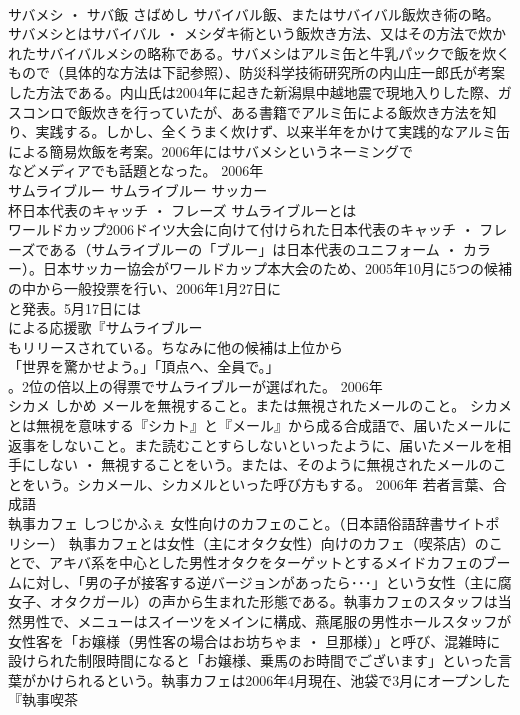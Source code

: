 \documentclass[8pt]{extreport}
\begin{document}
\begin{CJK}{UTF8}{min}
\\	サバメシ ・ サバ飯	さばめし	サバイバル飯、またはサバイバル飯炊き術の略。	サバメシとはサバイバル ・ メシダキ術という飯炊き方法、又はその方法で炊かれたサバイバルメシの略称である。サバメシはアルミ缶と牛乳パックで飯を炊くもので（具体的な方法は下記参照）、防災科学技術研究所の内山庄一郎氏が考案した方法である。内山氏は2004年に起きた新潟県中越地震で現地入りした際、ガスコンロで飯炊きを行っていたが、ある書籍でアルミ缶による飯炊き方法を知り、実践する。しかし、全くうまく炊けず、以来半年をかけて実践的なアルミ缶による簡易炊飯を考案。2006年にはサバメシというネーミングで
\\	などメディアでも話題となった。	2006年	
\\	サムライブルー	サムライブルー	サッカー
\\	杯日本代表のキャッチ ・ フレーズ	サムライブルーとは
\\	ワールドカップ2006ドイツ大会に向けて付けられた日本代表のキャッチ ・ フレーズである（サムライブルーの「ブルー」は日本代表のユニフォーム ・ カラー）。日本サッカー協会がワールドカップ本大会のため、2005年10月に5つの候補の中から一般投票を行い、2006年1月27日に
\\	と発表。5月17日には
\\	による応援歌『サムライブルー 
\\	もリリースされている。ちなみに他の候補は上位から
\\	「世界を驚かせよう。」「頂点へ、全員で。」
\\	。2位の倍以上の得票でサムライブルーが選ばれた。	2006年	
\\	シカメ	しかめ	メールを無視すること。または無視されたメールのこと。	シカメとは無視を意味する『シカト』と『メール』から成る合成語で、届いたメールに返事をしないこと。また読むことすらしないといったように、届いたメールを相手にしない ・ 無視することをいう。または、そのように無視されたメールのことをいう。シカメール、シカメルといった呼び方もする。	2006年	若者言葉、合成語	
\\	執事カフェ	しつじかふぇ	女性向けのカフェのこと。（日本語俗語辞書サイトポリシー）	執事カフェとは女性（主にオタク女性）向けのカフェ（喫茶店）のことで、アキバ系を中心とした男性オタクをターゲットとするメイドカフェのブームに対し、「男の子が接客する逆バージョンがあったら･･･」という女性（主に腐女子、オタクガール）の声から生まれた形態である。執事カフェのスタッフは当然男性で、メニューはスイーツをメインに構成、燕尾服の男性ホールスタッフが女性客を「お嬢様（男性客の場合はお坊ちゃま ・ 旦那様）」と呼び、混雑時に設けられた制限時間になると「お嬢様、乗馬のお時間でございます」といった言葉がかけられるという。執事カフェは2006年4月現在、池袋で3月にオープンした『執事喫茶

\end{CJK}
\end{document}
